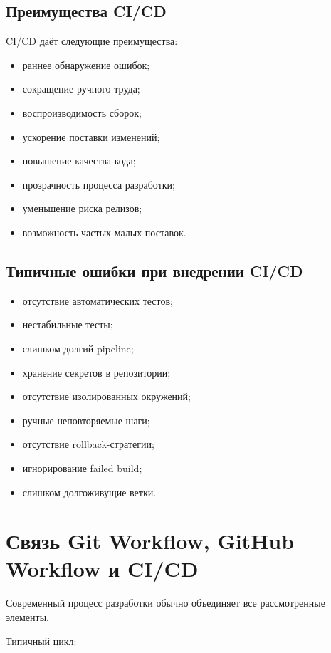 \documentclass[12pt,a4paper]{article}
\begin{document}
\subsection{Преимущества CI/CD}

CI/CD даёт следующие преимущества:

\begin{itemize}
    \item раннее обнаружение ошибок;
    \item сокращение ручного труда;
    \item воспроизводимость сборок;
    \item ускорение поставки изменений;
    \item повышение качества кода;
    \item прозрачность процесса разработки;
    \item уменьшение риска релизов;
    \item возможность частых малых поставок.
\end{itemize}

\subsection{Типичные ошибки при внедрении CI/CD}

\begin{itemize}
    \item отсутствие автоматических тестов;
    \item нестабильные тесты;
    \item слишком долгий pipeline;
    \item хранение секретов в репозитории;
    \item отсутствие изолированных окружений;
    \item ручные неповторяемые шаги;
    \item отсутствие rollback-стратегии;
    \item игнорирование failed build;
    \item слишком долгоживущие ветки.
\end{itemize}

\section{Связь Git Workflow, GitHub Workflow и CI/CD}

Современный процесс разработки обычно объединяет все рассмотренные элементы.

Типичный цикл:
\end{document}
